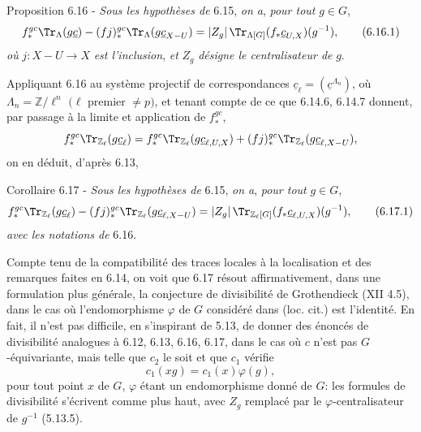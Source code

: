 \begin{statement}{Proposition 6.16 -}
\emph{Sous les hypothèses de} 6.15, \emph{on a}, \emph{pour tout} $g\in G$,
\begin{equation}
f_*^{gc}\Tr_{\Lambda}(g\underline c)
-(fj)_*^{gc}\Tr_{\Lambda}(g\underline c_{X-U})
=
|Z_g|\,\Tr_{\Lambda[G]}(f_*\underline c_{U,X})(g^{-1}),
\tag{6.16.1}
\end{equation}
\emph{où} $j:X-U\to X$ \emph{est l'inclusion}, \emph{et} $Z_g$ \emph{désigne le centralisateur de} $g$.
\end{statement}

Appliquant 6.16 au système projectif de correspondances $\underline c_{\ell}=(\underline c^{\Lambda_n})$, où $\Lambda_n=\mathbb{Z}/\ell^n$ $(\ell$ premier $\ne p)$, et tenant compte de ce que 6.14.6, 6.14.7 donnent, par passage à la limite et application de $f_*^{gc}$,
\[
f_*^{gc}\Tr_{\mathbb{Z}_{\ell}}(g\underline c_{\ell})
=
f_*^{gc}\Tr_{\mathbb{Z}_{\ell}}(g\underline c_{\ell,U,X})
+(fj)_*^{gc}\Tr_{\mathbb{Z}_{\ell}}(g\underline c_{\ell,X-U}),
\]
on en déduit, d'après 6.13,

\begin{statement}{Corollaire 6.17 -}
\emph{Sous les hypothèses de} 6.15, \emph{on a}, \emph{pour tout} $g\in G$,
\begin{equation}
f_*^{gc}\Tr_{\mathbb{Z}_{\ell}}(g\underline c_{\ell})
-(fj)_*^{gc}\Tr_{\mathbb{Z}_{\ell}}(g\underline c_{\ell,X-U})
=
|Z_g|\,\Tr_{\mathbb{Z}_{\ell}[G]}(f_*\underline c_{\ell,U,X})(g^{-1}),
\tag{6.17.1}
\end{equation}
\emph{avec les notations de} 6.16.
\end{statement}

Compte tenu de la compatibilité des traces locales à la localisation et des remarques faites en 6.14, on voit que 6.17 résout affirmativement, dans une formulation plus générale, la conjecture de divisibilité de Grothendieck (XII 4.5), dans le cas où l'endomorphisme $\varphi$ de $G$ considéré dans (loc. cit.) est l'identité.
En
fait, il n'est pas difficile, en s'inspirant de 5.13, de donner des énoncés de divisibilité analogues à 6.12, 6.13, 6.16, 6.17, dans le cas où $c$ n'est pas $G$-équivariante, mais telle que $c_2$ le soit et que $c_1$ vérifie
\[
c_1(xg)=c_1(x)\varphi(g),
\]
pour tout point $x$ de $G$, $\varphi$ étant un endomorphisme donné de $G$: les formules de divisibilité s'écrivent comme plus haut, avec $Z_g$ remplacé par le $\varphi$-centralisateur de $g^{-1}$ (5.13.5).

